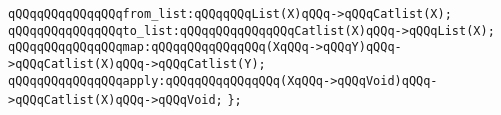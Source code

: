 \newline
\verb|qQQqqQQqqQQqqQQqfrom_list:qQQqqQQqList(X)qQQq->qQQqCatlist(X);|\newline
\verb|qQQqqQQqqQQqqQQqto_list:qQQqqQQqqQQqqQQqCatlist(X)qQQq->qQQqList(X);|\newline
\newline
\verb|qQQqqQQqqQQqqQQqmap:qQQqqQQqqQQqqQQq(XqQQq->qQQqY)qQQq->qQQqCatlist(X)qQQq->qQQqCatlist(Y);|\newline
\verb|qQQqqQQqqQQqqQQqapply:qQQqqQQqqQQqqQQq(XqQQq->qQQqVoid)qQQq->qQQqCatlist(X)qQQq->qQQqVoid;|\newline
\verb|};|\newline
\newline
\newline

